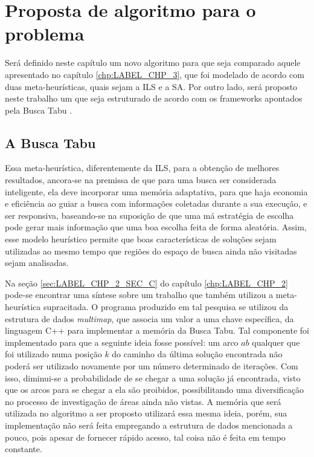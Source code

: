 \chapter{Proposta de algoritmo para o problema}\label{chp:LABEL_CHP_6}

\par Será definido neste capítulo um novo algoritmo para que seja comparado aquele apresentado no capítulo \ref{chp:LABEL_CHP_3}, que foi modelado de acordo com duas meta-heurísticas, quais sejam a ILS e a SA. Por outro lado, será proposto neste trabalho um que seja estruturado de acordo com os frameworks apontados pela Busca Tabu \citet{glover}.

\section{A Busca Tabu}\label{sec:LABEL_CHP_6_SEC_A}

\par Essa meta-heurística, diferentemente da ILS, para a obtenção de melhores resultados, ancora-se na premissa de que para uma busca ser considerada inteligente, ela deve incorporar uma memória adaptativa, para que haja economia e eficiência ao guiar a busca com informações coletadas durante a sua execução, e ser responsiva, baseando-se na suposição de que uma má estratégia de escolha pode gerar mais informação que uma boa escolha feita de forma aleatória. Assim, esse modelo heurístico permite que boas características de soluções sejam utilizadas ao mesmo tempo que regiões do espaço de busca ainda não visitadas sejam analisadas.

\par Na seção \ref{sec:LABEL_CHP_2_SEC_C} do capítulo \ref{chp:LABEL_CHP_2} pode-se encontrar uma síntese sobre um trabalho que também utilizou a meta-heurística supracitada. O programa produzido em tal pesquisa se utilizou da estrutura de dados \textit{multimap}, que associa um valor a uma chave específica, da linguagem C++ para implementar a memória da Busca Tabu. Tal componente foi implementado para que a seguinte ideia fosse possível: um arco $ab$ qualquer que foi utilizado numa posição $k$ do caminho da última solução encontrada não poderá ser utilizado novamente por um número determinado de iterações. Com isso, diminui-se a probabilidade de se chegar a uma solução já encontrada, visto que os arcos para se chegar a ela são proibidos, possibilitando uma diversificação no processo de investigação de áreas ainda não vistas. A memória que será utilizada no algoritmo a ser proposto utilizará essa mesma ideia, porém, sua implementação não será feita empregando a estrutura de dados mencionada a pouco, pois apesar de fornecer rápido acesso, tal coisa não é feita em tempo constante.

